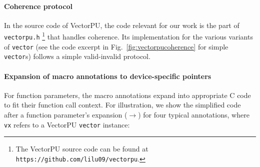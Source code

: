 \paragraph{Coherence protocol}
%
In the source code of VectorPU, the code
relevant for our work is the part of \verb+vectorpu.h+%
\footnote{The VectorPU source code can be found at
\texttt{https://github.com/lilu09/vectorpu}.} 
that handles coherence. Its implementation for the various
variants of \texttt{vector} 
(see the code excerpt in Fig.~\ref{fig:vectorpucoherence} for
simple \texttt{vector}s) follows a
simple valid-invalid protocol.

\paragraph{Expansion of macro annotations to device-specific pointers}

For function parameters, the macro annotations expand into appropriate C code to fit their function call context.
For illustration, we show the simplified code after a function parameter's expansion ($\longrightarrow$) for four typical annotations,
where \texttt{vx} refers to a VectorPU \texttt{vector} instance:

